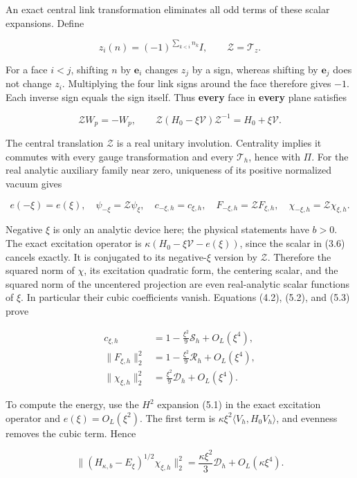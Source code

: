 \documentclass[
  11pt,
]{article}
\begin{document}
An exact central link transformation eliminates all odd terms of these
scalar expansions. Define

\[
z_i(n)=(-1)^{\sum_{k<i}n_k}I,\qquad \mathcal Z=\mathcal T_z.
\tag{5.4}
\]

For a face \(i<j\), shifting \(n\) by \(\mathbf e_i\) changes \(z_j\) by
a sign, whereas shifting by \(\mathbf e_j\) does not change \(z_i\).
Multiplying the four link signs around the face therefore gives \(-1\).
Each inverse sign equals the sign itself. Thus \textbf{every} face in
\textbf{every} plane satisfies

\[
\mathcal ZW_p=-W_p,\qquad
\mathcal Z(H_0-\xi\mathcal V)\mathcal Z^{-1}=H_0+\xi\mathcal V.
\tag{5.5}
\]

The central translation \(\mathcal Z\) is a real unitary involution.
Centrality implies it commutes with every gauge transformation and every
\(\mathcal T_h\), hence with \(\Pi\). For the real analytic auxiliary
family near zero, uniqueness of its positive normalized vacuum gives

\[
e(-\xi)=e(\xi),\quad
\psi_{-\xi}=\mathcal Z\psi_\xi,\quad
c_{-\xi,h}=c_{\xi,h},\quad
F_{-\xi,h}=\mathcal ZF_{\xi,h},\quad
\chi_{-\xi,h}=\mathcal Z\chi_{\xi,h}.
\tag{5.6}
\]

Negative \(\xi\) is only an analytic device here; the physical
statements have \(b>0\). The exact excitation operator is
\(\kappa(H_0-\xi\mathcal V-e(\xi))\), since the scalar in (3.6) cancels
exactly. It is conjugated to its negative-\(\xi\) version by
\(\mathcal Z\). Therefore the squared norm of \(\chi\), its excitation
quadratic form, the centering scalar, and the squared norm of the
uncentered projection are even real-analytic scalar functions of
\(\xi\). In particular their cubic coefficients vanish. Equations (4.2),
(5.2), and (5.3) prove

\[
\boxed{\begin{split}
c_{\xi,h}&=1-\frac{\xi^2}{9}\mathcal S_h+O_L(\xi^4),\\
\|F_{\xi,h}\|_2^2&=1-\frac{\xi^2}{9}\mathcal R_h+O_L(\xi^4),\\
\|\chi_{\xi,h}\|_2^2&=\frac{\xi^2}{9}\mathcal D_h+O_L(\xi^4).
\end{split}}
\tag{5.7}
\]

To compute the energy, use the \(H^2\) expansion (5.1) in the exact
excitation operator and \(e(\xi)=O_L(\xi^2)\). The first term is
\(\kappa\xi^2\langle V_h,H_0V_h\rangle\), and evenness removes the cubic
term. Hence

\[
\boxed{\|(H_{\kappa,b}-E_\xi)^{1/2}\chi_{\xi,h}\|_2^2
=\frac{\kappa\xi^2}{3}\mathcal D_h+O_L(\kappa\xi^4).}
\tag{5.8}
\]
\end{document}
